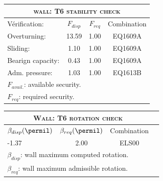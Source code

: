 \begin{center}
\begin{tabular}[H]{|l|c|c|c|}
\hline
\multicolumn{4}{|c|}{\textsc{wall: T6 stability check}}\\
\hline
Vérification:  & $F_{disp}$ & $F_{req}$ & Combination\\
\hline
Overturning:  & 13.59 & 1.00 & EQ1609A\\
Sliding:  & 1.10 & 1.00 & EQ1609A\\
Bearign capacity:  & 0.43 & 1.00 & EQ1609A\\
Adm. pressure:  & 1.03 & 1.00 & EQ1613B\\
\hline
\multicolumn{4}{|l|}{$F_{avail.}$: available security.}\\
\multicolumn{4}{|l|}{$F_{req}$: required security.}\\
\hline
\end{tabular}
\end{center}
\begin{center}
\begin{tabular}[H]{|l|c|c|c|}
\hline
\multicolumn{3}{|c|}{\textsc{Wall: T6 rotation check}}\\
\hline
$\beta_{disp} (\permil)$ & $\beta_{req}(\permil)$ & Combination\\
\hline
-1.37 & 2.00 & ELS00\\
\hline
\multicolumn{3}{|l|}{$\beta_{disp}$: wall maximum computed rotation.}\\
\multicolumn{3}{|l|}{$\beta_{req}$: wall maximum admissible rotation.}\\
\hline
\end{tabular}
\end{center}
 \label{tb_T6}
\tablelasttail{\hline}
